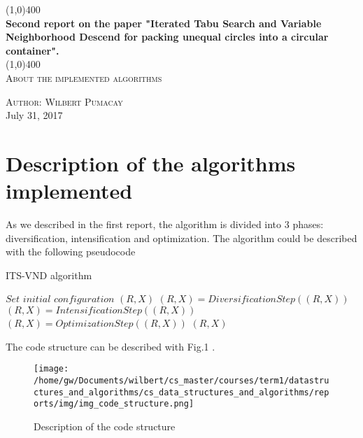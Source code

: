 \documentclass{article}
\begin{document}
\begin{titlepage}
	\begin{center}
	\line(1,0){400}\\
	\huge{\bfseries Second report on the paper "Iterated Tabu Search and 		Variable Neighborhood Descend for packing unequal circles into a circular container".}\\
	\line(1,0){400}\\
	\textsc{\Large About the implemented algorithms }
	\end{center}
	\vspace{5in}
	\begin{flushright}
	\textsc{\large Author: Wilbert Pumacay\\}
	July 31, 2017
	\end{flushright}
	
\end{titlepage}

\section{Description of the algorithms implemented}\label{sec:intro}%
As we described in the first report, the algorithm is divided into 3 phases: diversification, intensification and optimization. The algorithm could be described with the following pseudocode\\

\begin{algorithm}
\caption{ITS-VND algorithm}\label{solution_pseudocode}
\begin{algorithmic}[1]
\State $\textit{Set initial configuration }(R,X)$
	\State $(R,X)=\textit{DiversificationStep}((R,X))$
	\State $(R,X)=\textit{IntensificationStep}((R,X))$
	\State $(R,X)=\textit{OptimizationStep}((R,X))$
\EndWhile
\Return $(R,X)$
\end{algorithmic}
\end{algorithm}


The code structure can be described with Fig.1 .

\begin{figure}[H]
	\centering
	\texttt{[image: /home/gw/Documents/wilbert/cs\_master/courses/term1/datastructures\_and\_algorithms/cs\_data\_structures\_and\_algorithms/reports/img/img\_code\_structure.png]}
	\caption{Description of the code structure}
	\label{fig:img_pecc}
\end{figure}
\end{document}
